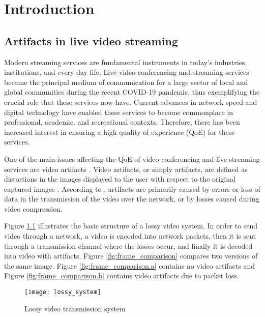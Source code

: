 
\chapter{Introduction}
\label{chp:intro}

\section{Artifacts in live video streaming}
\label{sec:intro_artifacts}

Modern streaming services are fundamental instruments in today's industries, institutions, and every day life. Live video conferencing and streaming services became the principal medium of communication for a large sector of local and global communities during the recent COVID-19 pandemic, thus exemplifying the crucial role that these services now have. Current advances in network speed and digital technology have enabled these services to become commonplace in professional, academic, and recreational contexts. Therefore, there has been increased interest in ensuring a high quality of experience (QoE) for these services.

One of the main issues affecting the QoE of video conferencing and live streaming services are video artifacts \cite{Vranjes2018, Korhonen2018}. Video artifacts, or simply artifacts, are defined as distortions in the images displayed to the user with respect to the original captured images \cite{Greengrass2009}. According to \cite{Vranjes2018}, artifacts are primarily caused by errors or loss of data in the transmission of the video over the network, or by losses caused during video compression.

Figure \ref{fig:lossy_system} illustrates the basic structure of a lossy video system. In order to send video through a network, a video is encoded into network packets, then it is sent through a transmission channel where the losses occur, and finally it is decoded into video with artifacts. Figure \ref{fig:frame_comparison} compares two versions of the same image. Figure \ref{fig:frame_comparison.a} contains no video artifacts and Figure \ref{fig:frame_comparison.b} contains video artifacts due to packet loss.

\begin{figure} [!h]
  \centering
  
  \texttt{[image: lossy\_system]}
  
  \caption{Lossy video transmission system}
  \label{fig:lossy_system}

\end{figure}

